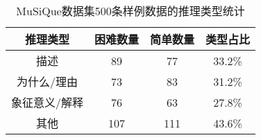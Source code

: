 \begin{table}[htbp]
    \centering
    \caption{MuSiQue数据集500条样例数据的推理类型统计}
    \label{tab:2-6}
    \begin{tabular}{cccc}
        \hline
        推理类型 & 困难数量 & 简单数量 & 类型占比 \\
        \hline
        描述 & 89 & 77 & 33.2\%  \\
        为什么/理由 & 73 & 83 & 31.2\%  \\
        象征意义/解释 & 76 & 63 & 27.8\%  \\
        其他 & 107 & 111 & 43.6\%  \\
        \hline
    \end{tabular}
\end{table}

